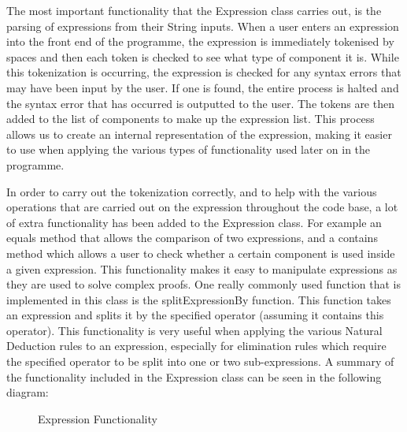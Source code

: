 The most important functionality that the Expression class carries out, is the parsing of expressions from their String inputs. When a user enters an expression into the front end of the programme,  the expression is immediately tokenised by spaces and then each token is checked to see what type of component it is. While this tokenization is occurring, the expression is checked for any syntax errors that may have been input by the user. If one is found, the entire process is halted and the syntax error that has occurred is outputted to the user. The tokens are then added to the list of components to make up the expression list. This process allows us to create an internal representation of the expression, making it easier to use when applying the various types of functionality used later on in the programme. 

In order to carry out the tokenization correctly, and to help with the various operations that are carried out on the expression throughout the code base, a lot of extra functionality has been added to the Expression class. For example an equals method that allows the comparison of two expressions, and a contains method which allows a user to check whether a certain component is used inside a given expression. This functionality makes it easy to manipulate expressions as they are used to solve complex proofs. One really commonly used function that is implemented in this class is the splitExpressionBy function. This function takes an expression and splits it by the specified operator (assuming it contains this operator). This functionality is very useful when applying the various Natural Deduction rules to an expression, especially for elimination rules which require the specified operator to be split into one or two sub-expressions. A summary of the functionality included in the Expression class can be seen in the following diagram:

\begin{figure}[!ht]
	\centering
	\caption{Expression Functionality}
\end{figure}

